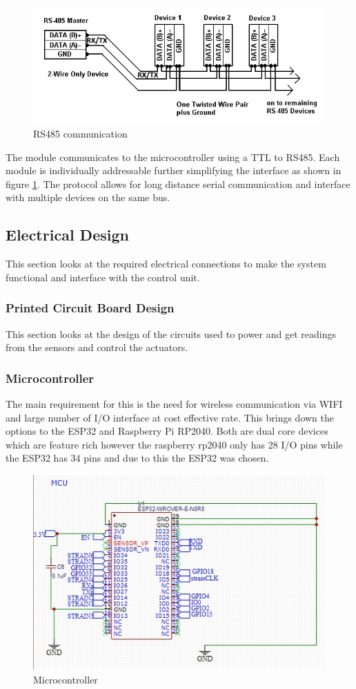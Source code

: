 \begin{center}
\begin{figure}[H]
\centering
\includegraphics{Figures/modbus}
\caption[RS485 communication]{RS485 communication}
\label{fig:rs485}
\end{figure}
\end{center}
The module communicates to the microcontroller using a TTL to RS485. Each module is individually addressable further simplifying the interface as shown in figure \ref{fig:rs485}. 
The protocol allows for long distance serial communication and interface with multiple devices on the same bus.

\subsection{Electrical Design}
This section looks at the required electrical connections to make the system functional and interface with the control unit.
\subsubsection{Printed Circuit Board Design}
This section looks at the design of the circuits used to power and get readings from the sensors and control the actuators.

\subsubsection{Microcontroller}
The main requirement for this is the need for wireless communication via WIFI and large number of I/O interface at cost effective rate. This brings down the options to the ESP32 and Raspberry Pi RP2040. Both are dual core devices which are feature rich however the raspberry rp2040 only has 28 I/O pins while the ESP32 has 34 pins and due to this the ESP32 was chosen. 
\begin{center}
	\begin{figure}[H]
	\centering
	\includegraphics[width=0.7\linewidth]{Figures/mcu}
	\caption[Microcontroller]{Microcontroller}
	\end{figure}
\end{center}
